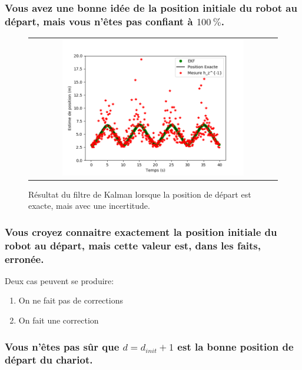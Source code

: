 \documentclass[12pt]{article}
\begin{document}
\subsubsection{Vous avez une bonne idée de la position initiale du robot au départ, mais vous n'êtes pas confiant à $100~\%$.}

\begin{figure}[ht]
 \begin{center}
  \begin{tabular}{c}
    \includegraphics[width=0.75\textwidth]{fig/kalman-position-exacte-incertitude.png}
  \end{tabular}
 \end{center}
\vspace{-0.25in}
    \caption{Résultat du filtre de Kalman lorsque la position de départ est exacte, mais avec une incertitude.}
    \label{kalman-position-exacte-incertitude}
\end{figure}

\subsubsection{Vous croyez connaitre exactement la position initiale du robot au départ, mais cette valeur est, dans les faits, erronée.}

Deux cas peuvent se produire:
\begin{enumerate}
    \item On ne fait pas de corrections
    \item On fait une correction
\end{enumerate}

\subsubsection{Vous n'êtes pas sûr que $d=d_{init}+1$ est la bonne position de départ du chariot.}
\end{document}
